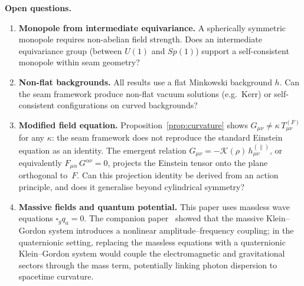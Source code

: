 \documentclass[pdflatex,sn-mathphys-num]{sn-jnl}
\theoremstyle{thmstyleone}%
\theoremstyle{thmstyletwo}%
\theoremstyle{thmstylethree}%
\numberwithin{equation}{section}
\begin{document}
\begin{center}
\end{center}

\medskip\noindent
\textbf{Open questions.}

\begin{enumerate}[noitemsep]
\item \textbf{Monopole from intermediate equivariance.}
  A spherically symmetric monopole requires non-abelian field
  strength.  Does an intermediate equivariance group (between
  $U(1)$ and $Sp(1)$) support a self-consistent monopole
  within seam geometry?

\item \textbf{Non-flat backgrounds.}
  All results use a flat Minkowski background $h$.  Can the
  seam framework produce non-flat vacuum solutions (e.g.\ Kerr)
  or self-consistent configurations on curved backgrounds?

\item \textbf{Modified field equation.}
  Proposition~\ref{prop:curvature} shows $G_{\mu\nu} \neq
  \kappa\,T^{(F)}_{\mu\nu}$ for any $\kappa$: the seam
  framework does not reproduce the standard Einstein equation
  as an identity.  The emergent relation
  $G_{\mu\nu} = -\mathcal{K}(\rho)\,h^{(\|)}_{\mu\nu}$, or
  equivalently $F_{\mu\alpha}\,G^{\alpha\nu} = 0$, projects the
  Einstein tensor onto the plane orthogonal to~$F$.
  Can this projection identity be derived from an action
  principle, and does it generalise beyond cylindrical
  symmetry?

\item \textbf{Massive fields and quantum potential.}
  This paper uses massless wave equations $\square_g q_a = 0$.
  The companion paper~\cite{seam1} showed that the massive
  Klein--Gordon system introduces a nonlinear
  amplitude--frequency coupling; in the quaternionic setting,
  replacing the massless equations with a quaternionic
  Klein--Gordon system would couple the electromagnetic and
  gravitational sectors through the mass term, potentially
  linking photon dispersion to spacetime curvature.
\end{enumerate}
\end{document}
